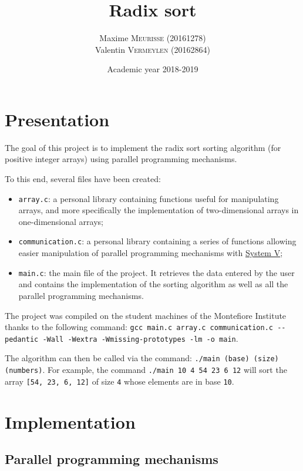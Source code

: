 \documentclass[a4paper, 12pt]{article}
\title{Radix sort}
\author{Maxime \textsc{Meurisse} (20161278)\\Valentin \textsc{Vermeylen} (20162864)\\}
\date{Academic year 2018-2019}
\begin{document}
	
	
	
	\section{Presentation}
	The goal of this project is to implement the \og radix sort\fg{} sorting algorithm (for positive integer arrays) using parallel programming mechanisms.\par
	
	To this end, several files have been created:
	
	\begin{itemize}
	    \item \texttt{array.c}: a personal library containing functions useful for manipulating arrays, and more specifically the implementation of two-dimensional arrays in one-dimensional arrays;
	    \item \texttt{communication.c}: a personal library containing a series of functions allowing easier manipulation of parallel programming mechanisms with \href{https://fr.wikipedia.org/wiki/UNIX_System_V}{System V};
	    \item \texttt{main.c}: the main file of the project. It retrieves the data entered by the user and contains the implementation of the sorting algorithm as well as all the parallel programming mechanisms.
	\end{itemize}
	
	The project was compiled on the student machines of the Montefiore Institute thanks to the following command: \texttt{gcc main.c array.c communication.c -{}-pedantic -Wall -Wextra -Wmissing-prototypes -lm -o main}.\par
	
	The algorithm can then be called via the command: \texttt{./main (base) (size) (numbers)}. For example, the command \texttt{./main 10 4 54 23 6 12} will sort the array \texttt{[54, 23, 6, 12]} of size \texttt{4} whose elements are in base \texttt{10}.
	
	
	\section{Implementation}
	
	\subsection{Parallel programming mechanisms}
	
\end{document}
